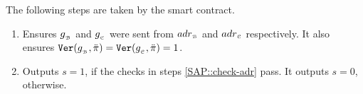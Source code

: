 \begin{enumerate}[leftmargin=5.2mm]
 The following steps are taken by the smart contract.
   \begin{enumerate}
   
\item\label{SAP::check-adr} Ensures $g_{_{\scriptscriptstyle\mathcal B}}$ and $g_{_{\scriptscriptstyle\mathcal C}}$ were sent from   $adr_{\scriptscriptstyle \mathcal{B}}$ and  $adr_{\scriptscriptstyle \mathcal{C}}$  respectively. 
%
It also ensures $\mathtt{Ver}(g_{_{\scriptscriptstyle\mathcal B}},\ddot{\pi})=\mathtt{Ver}(g_{_{\scriptscriptstyle\mathcal C}},\ddot{\pi}) =1$.
   
   \item Outputs $s=1$, if the checks in steps \ref{SAP::check-adr} pass. It outputs $s=0$, otherwise.
    \end{enumerate}
 \end{enumerate}


 
 
  
  
  
  
%



